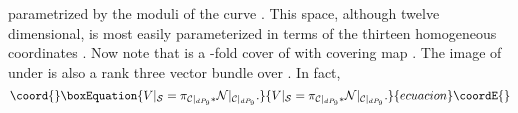 \documentclass[a4paper,12pt]{article}
\numberwithin{equation}{section}
\theoremstyle{plain}
\begin{document}
%
parametrized by
the moduli of
the curve
\coordHE{}.
This space, although twelve dimensional, is most easily parameterized in
terms
of the thirteen homogeneous coordinates \coordHE{}.
Now note that \coordHE{} is a \coordHE{}-fold cover of \coordHE{} with
covering map
\coordHE{}.
The image of \coordHE{}
under \coordHE{} is also
a rank three vector bundle over \coordHE{}. In fact,
%
\begin{equation}\coord{}\boxEquation{
V|_{{\cal S}} =\pi_{{\cal C}|_{dP_9}*}{\cal N}|_{{\cal{C}}|_{dP_9}}.
\label{ccc}
}{
V|_{{\cal S}} =\pi_{{\cal C}|_{dP_9}*}{\cal N}|_{{\cal{C}}|_{dP_9}}.
}{ecuacion}\coordE{}\end{equation}
%
\end{document}
